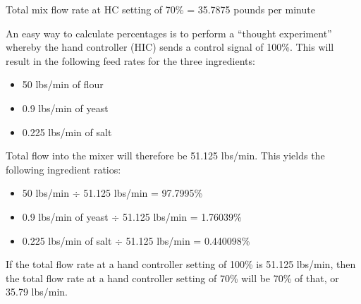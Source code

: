Total mix flow rate at HC setting of 70\% = 35.7875 pounds per minute







An easy way to calculate percentages is to perform a ``thought experiment'' whereby the hand controller (HIC) sends a control signal of 100\%.  This will result in the following feed rates for the three ingredients:

\begin{itemize}
\item{} 50 lbs/min of flour
\item{} 0.9 lbs/min of yeast
\item{} 0.225 lbs/min of salt
\end{itemize}

Total flow into the mixer will therefore be 51.125 lbs/min.  This yields the following ingredient ratios:

\begin{itemize}
\item{} 50 lbs/min $\div$ 51.125 lbs/min = 97.7995\%
\item{} 0.9 lbs/min of yeast $\div$ 51.125 lbs/min = 1.76039\%
\item{} 0.225 lbs/min of salt $\div$ 51.125 lbs/min = 0.440098\%
\end{itemize}

If the total flow rate at a hand controller setting of 100\% is 51.125 lbs/min, then the total flow rate at a hand controller setting of 70\% will be 70\% of that, or 35.79 lbs/min.




